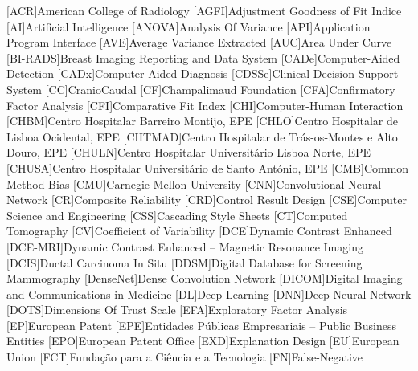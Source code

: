 
\begin{acronym}[H.264/SVC]
[ACR]{American College of Radiology}
[AGFI]{Adjustment Goodness of Fit Indice}
[AI]{Artificial Intelligence}
[ANOVA]{Analysis Of Variance}
[API]{Application Program Interface}
[AVE]{Average Variance Extracted}
[AUC]{Area Under Curve}
[BI-RADS]{Breast Imaging Reporting and Data System}
[CADe]{Computer-Aided Detection}
[CADx]{Computer-Aided Diagnosis}
[CDSSe]{Clinical Decision Support System}
[CC]{CranioCaudal}
[CF]{Champalimaud Foundation}
[CFA]{Confirmatory Factor Analysis}
[CFI]{Comparative Fit Index}
[CHI]{Computer-Human Interaction}
[CHBM]{Centro Hospitalar Barreiro Montijo, \acs{EPE}}
[CHLO]{Centro Hospitalar de Lisboa Ocidental, \acs{EPE}}
[CHTMAD]{Centro Hospitalar de Tr\'{a}s-os-Montes e Alto Douro, \acs{EPE}}
[CHULN]{Centro Hospitalar Universit\'{a}rio Lisboa Norte, \acs{EPE}}
[CHUSA]{Centro Hospitalar Universit\'{a}rio de Santo Ant\'{o}nio, \acs{EPE}}
[CMB]{Common Method Bias}
[CMU]{Carnegie Mellon University}
[CNN]{Convolutional Neural Network}
[CR]{Composite Reliability}
[CRD]{Control Result Design}
[CSE]{Computer Science and Engineering}
[CSS]{Cascading Style Sheets}
[CT]{Computed Tomography}
[CV]{Coefficient of Variability}
[DCE]{Dynamic Contrast Enhanced}
[DCE-MRI]{Dynamic Contrast Enhanced -- Magnetic Resonance Imaging}
[DCIS]{Ductal Carcinoma In Situ}
[DDSM]{Digital Database for Screening Mammography}
[DenseNet]{Dense Convolution Network}
[DICOM]{Digital Imaging and Communications in Medicine}
[DL]{Deep Learning}
[DNN]{Deep Neural Network}
[DOTS]{Dimensions Of Trust Scale}
[EFA]{Exploratory Factor Analysis}
[EP]{European Patent}
[EPE]{Entidades Públicas Empresariais -- Public Business Entities}
[EPO]{European Patent Office}
[EXD]{Explanation Design}
[EU]{European Union}
[FCT]{Funda\c{c}\~{a}o para a Ci\^{e}ncia e a Tecnologia}
[FN]{False-Negative}

\end{acronym}
